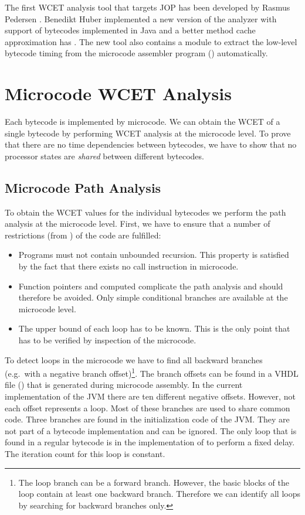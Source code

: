 The first WCET analysis tool that targets JOP has been developed by
Rasmus Pedersen \cite{jop:wcet:jtres06}. Benedikt Huber implemented a
new version of the analyzer with support of bytecodes implemented in
Java and a better method cache approximation has
\cite{jop:wcet:model:checking}. The new tool also contains a module
to extract the low-level bytecode timing from the microcode assembler
program () automatically.

\section{Microcode WCET Analysis}

Each bytecode is implemented by microcode. We can obtain the WCET of
a single bytecode by performing WCET analysis at the microcode level.
To prove that there are no time dependencies between bytecodes, we
have to show that no processor states are \emph{shared} between
different bytecodes.

\subsection{Microcode Path Analysis}

To obtain the WCET values for the individual bytecodes we perform
the path analysis at the microcode level. First, we have to ensure
that a number of restrictions (from \cite{pusch:maxt:jnl}) of the
code are fulfilled:
%
\begin{itemize}
    \item Programs must not contain unbounded recursion. This property
    is satisfied by the fact that there exists no call instruction in
    microcode.
    \item Function pointers and computed  complicate the
    path analysis and should therefore be avoided. Only simple conditional
    branches are available at the microcode level.
    \item The upper bound of each loop has to be known. This is the only
    point that has to be verified by inspection of the microcode.
\end{itemize}
%
To detect loops in the microcode we have to find all backward
branches (e.g.\ with a negative branch offset)\footnote{The loop
branch can be a forward branch. However, the basic blocks of the
loop contain at least one backward branch. Therefore we can identify
all loops by searching for backward branches only.}. The branch
offsets can be found in a VHDL file () that is
generated during microcode assembly. In the current implementation
of the JVM there are ten different negative offsets. However, not
each offset represents a loop. Most of these branches are used to
share common code. Three branches are found in the initialization
code of the JVM. They are not part of a bytecode implementation and
can be ignored. The only loop that is found in a regular bytecode is
in the implementation of  to perform a fixed delay. The
iteration count for this loop is constant.

